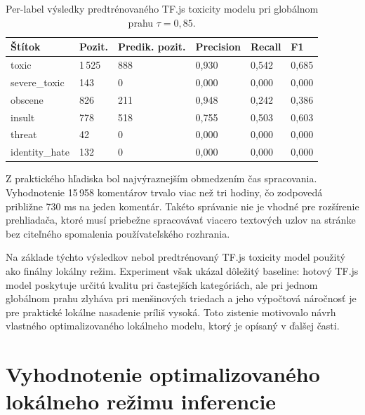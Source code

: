 \FloatBarrier
\begin{table}[!htbp]
  \centering
  \small
  \renewcommand{\arraystretch}{1.15}
  \setlength{\tabcolsep}{4pt}
  \begin{tabularx}{\textwidth}{|P{2.8cm}|Y|Y|Y|Y|Y|}
    \hline
    \textbf{Štítok} &
    \textbf{Pozit.} &
    \textbf{Predik. pozit.} &
    \textbf{Precision} &
    \textbf{Recall} &
    \textbf{F1} \\
    \hline
    toxic & 1\,525 & 888 & 0{,}930 & 0{,}542 & 0{,}685 \\
    \hline
    severe\_toxic & 143 & 0 & 0{,}000 & 0{,}000 & 0{,}000 \\
    \hline
    obscene & 826 & 211 & 0{,}948 & 0{,}242 & 0{,}386 \\
    \hline
    insult & 778 & 518 & 0{,}755 & 0{,}503 & 0{,}603 \\
    \hline
    threat & 42 & 0 & 0{,}000 & 0{,}000 & 0{,}000 \\
    \hline
    identity\_hate & 132 & 0 & 0{,}000 & 0{,}000 & 0{,}000 \\
    \hline
  \end{tabularx}
  \caption[Per-label výsledky predtrénovaného TF.js modelu]{Per-label výsledky predtrénovaného TF.js toxicity modelu pri globálnom prahu $\tau = 0{,}85$.}
  \label{tab:tfjs_eval_perlabel}
\end{table}
\FloatBarrier

Z praktického hľadiska bol najvýraznejším obmedzením čas spracovania. Vyhodnotenie 15\,958 komentárov trvalo viac než tri hodiny, čo zodpovedá približne 730 ms na jeden komentár. Takéto správanie nie je vhodné pre rozšírenie prehliadača, ktoré musí priebežne spracovávať viacero textových uzlov na stránke bez citeľného spomalenia používateľského rozhrania.

Na základe týchto výsledkov nebol predtrénovaný TF.js toxicity model použitý ako finálny lokálny režim. Experiment však ukázal dôležitý baseline: hotový TF.js model poskytuje určitú kvalitu pri častejších kategóriách, ale pri jednom globálnom prahu zlyháva pri menšinových triedach a jeho výpočtová náročnosť je pre praktické lokálne nasadenie príliš vysoká. Toto zistenie motivovalo návrh vlastného optimalizovaného lokálneho modelu, ktorý je opísaný v ďalšej časti.

\section{Vyhodnotenie optimalizovaného lokálneho režimu inferencie}

